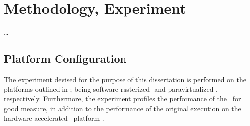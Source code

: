
\chapter{Methodology, Experiment}
\label{cha:methodologyexperiment}
\ldots



\section{Platform Configuration}
\label{sec:methodologyexperiment_platformconfiguration}
The experiment devised for the purpose of this dissertation is performed on the platforms outlined in ; being software rasterized- and paravirtualized \dvttermsimics , respectively.
Furthermore, the experiment profiles the performance of the \dvttermreferencesolution\ for good measure, in addition to the performance of the original execution on the hardware accelerated \dvttermhost\ platform .

